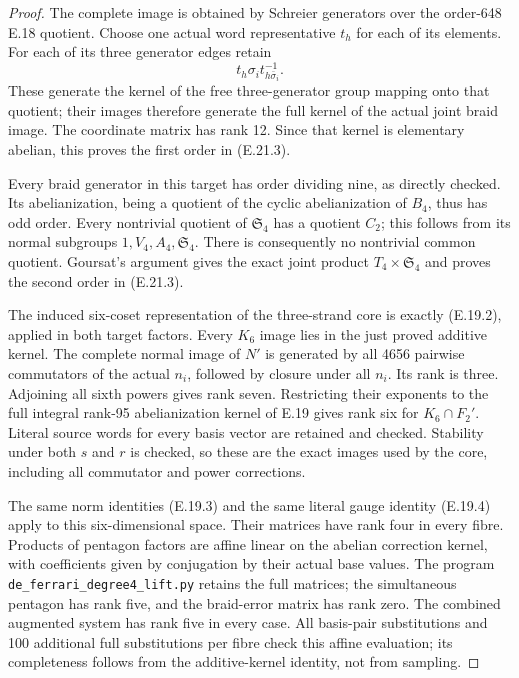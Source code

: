 \begin{proof}
The complete image is obtained by
Schreier generators over the order-648
E.18 quotient. Choose one actual
word representative $t_h$ for each
of its elements. For each of its
three generator edges retain
\[
              t_h\sigma_i t_{h\bar\sigma_i}^{-1}.
 \tag{E.21.4}
\]
These generate the kernel of the
free three-generator group mapping
onto that quotient; their images
therefore generate the full kernel
of the actual joint braid image.
The coordinate matrix has rank
12. Since that kernel is elementary
abelian, this proves the first
order in (E.21.3).

Every braid generator in this
target has order dividing nine,
as directly checked. Its
abelianization, being a quotient
of the cyclic abelianization of
$B_4$, thus has odd order. Every
nontrivial quotient of $\mathfrak S_4$
has a quotient $C_2$; this follows
from its normal subgroups
$1,V_4,A_4,\mathfrak S_4$.
There is consequently no nontrivial
common quotient. Goursat's argument
gives the exact joint product
$T_4\times\mathfrak S_4$ and proves
the second order in (E.21.3).

The induced six-coset representation
of the three-strand core is exactly
(E.19.2), applied in both target
factors. Every $K_6$ image lies
in the just proved additive kernel.
The complete normal image of $N'$
is generated by all 4656 pairwise
commutators of the actual $n_i$,
followed by closure under all $n_i$.
Its rank is three. Adjoining all
sixth powers gives rank seven.
Restricting their exponents to
the full integral rank-95
abelianization kernel of E.19
gives rank six for
$K_6\cap F_2'$. Literal source
words for every basis vector are
retained and checked. Stability
under both $s$ and $r$ is checked,
so these are the exact images
used by the core, including all
commutator and power corrections.

The same norm identities
(E.19.3) and the same literal
gauge identity (E.19.4) apply
to this six-dimensional space.
Their matrices have rank four
in every fibre. Products of
pentagon factors are affine
linear on the abelian correction
kernel, with coefficients given
by conjugation by their actual
base values. The program
\texttt{de\_ferrari\_degree4\_lift.py}
retains the full matrices; the
simultaneous pentagon has rank
five, and the braid-error matrix
has rank zero. The combined
augmented system has rank five
in every case. All basis-pair
substitutions and 100 additional
full substitutions per fibre
check this affine evaluation;
its completeness follows from
the additive-kernel identity,
not from sampling.


\end{proof}
